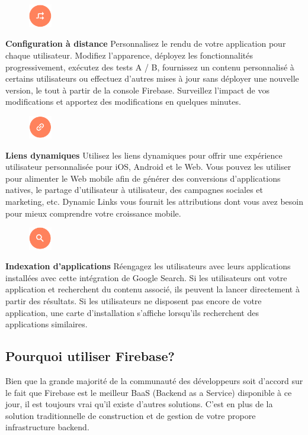 \begin{figure}
	\includegraphics[width=1cm]{Images/chapter2/firebase_services/remote_config.png}
\end{figure}
\textbf{Configuration à distance} Personnalisez le rendu de votre application pour chaque utilisateur. Modifiez l'apparence, déployez les fonctionnalités progressivement, exécutez des tests A / B, fournissez un contenu personnalisé à certains utilisateurs ou effectuez d'autres mises à jour sans déployer une nouvelle version, le tout à partir de la console Firebase. Surveillez l'impact de vos modifications et apportez des modifications en quelques minutes.\medskip

\begin{figure}
	\includegraphics[width=1cm]{Images/chapter2/firebase_services/dynamic_links.png}
\end{figure}
\textbf{Liens dynamiques} Utilisez les liens dynamiques pour offrir une expérience utilisateur personnalisée pour iOS, Android et le Web. Vous pouvez les utiliser pour alimenter le Web mobile afin de générer des conversions d'applications natives, le partage d'utilisateur à utilisateur, des campagnes sociales et marketing, etc. Dynamic Links vous fournit les attributions dont vous avez besoin pour mieux comprendre votre croissance mobile.\medskip

\begin{figure}
	\includegraphics[width=1cm]{Images/chapter2/firebase_services/app_indexing.png}
\end{figure}
\textbf{Indexation d'applications} Réengagez les utilisateurs avec leurs applications installées avec cette intégration de Google Search. Si les utilisateurs ont votre application et recherchent du contenu associé, ils peuvent la lancer directement à partir des résultats. Si les utilisateurs ne disposent pas encore de votre application, une carte d'installation s'affiche lorsqu'ils recherchent des applications similaires.\medskip

\subsection{Pourquoi utiliser Firebase?}
Bien que la grande majorité de la communauté des développeurs soit d’accord sur le fait que Firebase est le meilleur BaaS (Backend as a Service) disponible à ce jour, il est toujours vrai qu’il existe d’autres solutions. C’est en plus de la solution traditionnelle de construction et de gestion de votre propore infrastructure backend.\medskip

